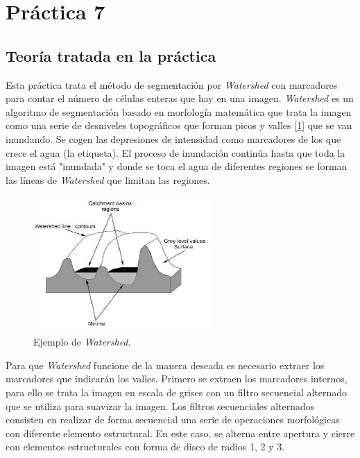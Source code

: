 \documentclass[a4paper,12pt]{report}
\begin{document}
\section{ Práctica 7}
\subsection{Teoría tratada en la práctica}

Esta práctica trata el método de segmentación por \emph{Watershed} con marcadores para contar el número de células enteras que hay en una imagen.\emph{ Watershed} es un algoritmo de segmentación basado en morfología matemática que trata la imagen como una serie de desniveles topográficos que forman picos y valles [\ref{watershed}] que se van inundando. Se cogen las depresiones de intensidad como marcadores de los que crece el agua (la etiqueta). El proceso de inundación continúa hasta que toda la imagen está "inundada" y donde se toca el agua de diferentes regiones se forman las líneas de  \emph{Watershed} que limitan las regiones.\\

\begin{figure}[h]
\centering
\includegraphics[width=0.6\textwidth]{imagenes/valles}
\caption{Ejemplo de \emph{Watershed}.}
\label{watershed} 
\end{figure}

Para que \emph{Watershed} funcione de la manera deseada es necesario extraer los marcadores que indicarán los valles. Primero se extraen los marcadores internos, para ello se trata la imagen en escala de grises con un filtro secuencial alternado que se utiliza para suavizar la imagen. Los filtros secuenciales alternados consisten en realizar de forma secuencial una serie de operaciones morfológicas con diferente elemento estructural. En este caso, se alterna entre apertura y cierre con elementos estructurales con forma de disco de radios 1, 2 y 3.\\
\end{document}
